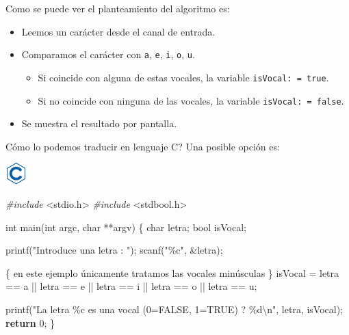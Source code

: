 \documentclass[
]{book}
\newenvironment{Shaded}{\begin{snugshade}}{\end{snugshade}}
\newcommand{\CharTok}[1]{\textcolor[rgb]{0.31,0.60,0.02}{#1}}
\newcommand{\ControlFlowTok}[1]{\textcolor[rgb]{0.13,0.29,0.53}{\textbf{#1}}}
\newcommand{\DataTypeTok}[1]{\textcolor[rgb]{0.13,0.29,0.53}{#1}}
\newcommand{\DecValTok}[1]{\textcolor[rgb]{0.00,0.00,0.81}{#1}}
\newcommand{\ImportTok}[1]{#1}
\newcommand{\NormalTok}[1]{#1}
\newcommand{\PreprocessorTok}[1]{\textcolor[rgb]{0.56,0.35,0.01}{\textit{#1}}}
\newcommand{\SpecialCharTok}[1]{\textcolor[rgb]{0.00,0.00,0.00}{#1}}
\newcommand{\StringTok}[1]{\textcolor[rgb]{0.31,0.60,0.02}{#1}}
\providecommand{\tightlist}{%
  \setlength{\itemsep}{0pt}\setlength{\parskip}{0pt}}
\begin{document}
Como se puede ver el planteamiento del algoritmo es:

\begin{itemize}
\tightlist
\item
  Leemos un carácter desde el canal de entrada.
\item
  Comparamos el carácter con \texttt{a}, \texttt{e}, \texttt{i}, \texttt{o}, \texttt{u}.

  \begin{itemize}
  \tightlist
  \item
    Si coincide con alguna de estas vocales, la variable \texttt{isVocal:\ =\ true}.
  \item
    Si no coincide con ninguna de las vocales, la variable \texttt{isVocal:\ =\ false}.
  \end{itemize}
\item
  Se muestra el resultado por pantalla.
\end{itemize}

Cómo lo podemos traducir en lenguaje C? Una posible opción es:

\includegraphics{./img/c.png}

\begin{Shaded}
\begin{Highlighting}[]
\PreprocessorTok{\#include }\ImportTok{\textless{}stdio.h\textgreater{}}
\PreprocessorTok{\#include }\ImportTok{\textless{}stdbool.h\textgreater{}}

\DataTypeTok{int}\NormalTok{ main(}\DataTypeTok{int}\NormalTok{ argc, }\DataTypeTok{char}\NormalTok{ **argv) \{}
    \DataTypeTok{char}\NormalTok{ letra;}
    \DataTypeTok{bool}\NormalTok{ isVocal;}

\NormalTok{    printf(}\StringTok{"Introduce una letra : "}\NormalTok{);}
\NormalTok{    scanf(}\StringTok{"\%c"}\NormalTok{, \&letra);}

\NormalTok{    \{ en este ejemplo únicamente tratamos las vocales minúsculas \}}
\NormalTok{    isVocal = letra == }\CharTok{\textquotesingle{}a\textquotesingle{}}\NormalTok{ || letra == }\CharTok{\textquotesingle{}e\textquotesingle{}}\NormalTok{ || letra == }\CharTok{\textquotesingle{}i\textquotesingle{}}\NormalTok{ || letra == }\CharTok{\textquotesingle{}o\textquotesingle{}}\NormalTok{ || letra == }\CharTok{\textquotesingle{}u\textquotesingle{}}\NormalTok{;}

\NormalTok{    printf(}\StringTok{"La letra \%c es una vocal (0=FALSE, 1=TRUE) ? \%d}\SpecialCharTok{\textbackslash{}n}\StringTok{"}\NormalTok{, letra, isVocal);}
    \ControlFlowTok{return} \DecValTok{0}\NormalTok{;}
\NormalTok{\}}
\end{Highlighting}
\end{Shaded}
\end{document}
